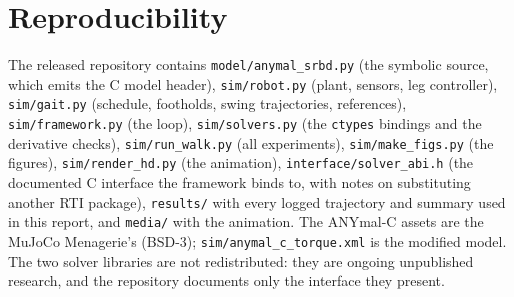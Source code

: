 \documentclass[11pt]{article}
\begin{document}
\section{Reproducibility}
The released repository \cite{repo} contains \texttt{model/anymal\_srbd.py} (the symbolic source, which emits the C model header), \texttt{sim/robot.py} (plant, sensors, leg controller), \texttt{sim/gait.py} (schedule, footholds, swing trajectories, references), \texttt{sim/framework.py} (the loop), \texttt{sim/solvers.py} (the \texttt{ctypes} bindings and the derivative checks), \texttt{sim/run\_walk.py} (all experiments), \texttt{sim/make\_figs.py} (the figures), \texttt{sim/render\_hd.py} (the animation), \texttt{interface/solver\_abi.h} (the documented C interface the framework binds to, with notes on substituting another RTI package), \texttt{results/} with every logged trajectory and summary used in this report, and \texttt{media/} with the animation. The ANYmal-C assets are the MuJoCo Menagerie's \cite{menagerie} (BSD-3); \texttt{sim/anymal\_c\_torque.xml} is the modified model. The two solver libraries are not redistributed: they are ongoing unpublished research, and the repository documents only the interface they present.
\end{document}
